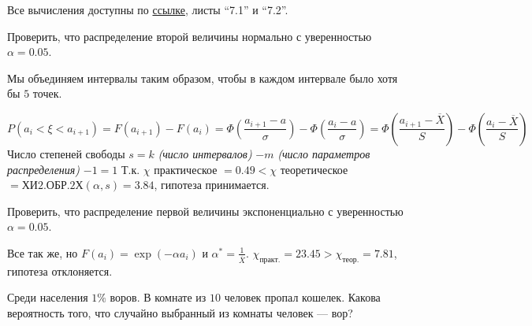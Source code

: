 

\cfoot{}



Все вычисления доступны по \href{https://docs.google.com/spreadsheets/d/1lU-0FnVcjXLhWT8c0K_v2xk-lVkF9Ary3zV-o6R1Was/edit?usp=sharing}{ссылке}, листы ``7.1'' и ``7.2''.

\begin{exercise}
    Проверить, что распределение второй величины нормально с уверенностью \(\alpha = 0.05\).
\end{exercise}

Мы объединяем интервалы таким образом, чтобы в каждом интервале было хотя бы \(5\) точек.

\[P(a_i < \xi < a_{i+1}) = F(a_{i+1}) - F(a_i) = \Phi\left(\frac{a_{i+1} - a}{\sigma}\right) - \Phi\left(\frac{a_i - a}{\sigma}\right) = \Phi\left(\frac{a_{i+1} - \overline{X}}{S}\right) - \Phi(\frac{a_i - \overline{X}}{S})\]
Число степеней свободы \(s = k\) \textit{(число интервалов)} \(- m\) \textit{(число параметров распределения)} \(- 1 = 1\)
Т.к. \(\chi\) практическое \( = 0.49 < \chi\) теоретическое \( = \text{ХИ2.ОБР.2Х}(\alpha, s) = 3.84\), гипотеза принимается.

\begin{exercise}
    Проверить, что распределение первой величины экспоненциально с уверенностью \(\alpha = 0.05\).
\end{exercise}

Все так же, но \(F(a_i) = \exp( - \alpha a_i)\) и \(\alpha^* = \frac{1}{\overline{X}}\). \(\chi_{\text{практ.}} = 23.45 > \chi_{\text{теор.}} = 7.81\), гипотеза отклоняется.

\begin{exercise}
    Среди населения \(1\%\) воров. В комнате из \(10\) человек пропал кошелек. Какова вероятность того, что случайно выбранный из комнаты человек --- вор?
\end{exercise}


